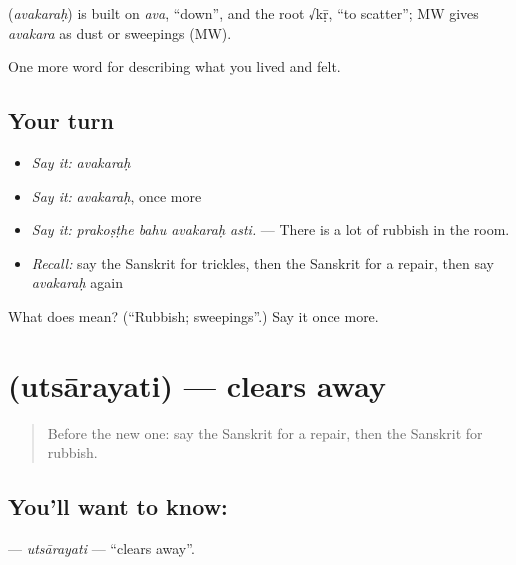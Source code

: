 \begin{cousinweb}
\textbf{} (\emph{avakaraḥ}) is built on \emph{ava}, \textquotedblleft{}down\textquotedblright{}, and the root √kṝ, \textquotedblleft{}to scatter\textquotedblright{}; MW gives \emph{avakara} as dust or sweepings (MW).
\end{cousinweb}

\begin{grammarlens}[title={What you've built}]
One more word for describing what you lived and felt.
\end{grammarlens}

\subsection*{Your turn}
\begin{itemize}
\raggedright
  \item \emph{Say it:} \emph{avakaraḥ}
  \item \emph{Say it:} \emph{avakaraḥ}, once more
  \item \emph{Say it:} \emph{prakoṣṭhe bahu avakaraḥ asti.} — There is a lot of rubbish in the room.
  \item \emph{Recall:} say the Sanskrit for trickles, then the Sanskrit for a repair, then say \emph{avakaraḥ} again
\end{itemize}

\begin{tcolorbox}[breakable,colback=teal!4,colframe=teal!35!black,title={Before you move on}]
What does  mean? (\textquotedblleft{}Rubbish; sweepings\textquotedblright{}.) Say it once more.
\end{tcolorbox}
\section[\texorpdfstring{\sk{उत्सारयति} (utsārayati)}{उत्सारयति (utsārayati)}]{ (utsārayati) — clears away}

\label{lesson:SA-C510-utsarayati}



\begin{quote}
Before the new one: say the Sanskrit for a repair, then the Sanskrit for rubbish.
\end{quote}

\subsection*{You'll want to know: }
\textbf{} — \emph{utsārayati} — \textquotedblleft{}clears away\textquotedblright{}.

